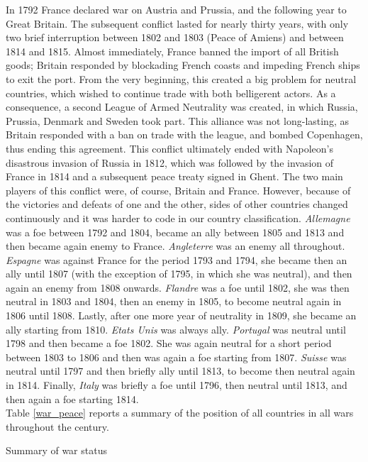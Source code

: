 \documentclass[12pt,a4paper,notitlepage,english]{article}
\begin{document}
In 1792 France declared war on Austria and Prussia, and the following year to Great Britain.
The subsequent conflict lasted for nearly thirty years, with only two brief interruption between 1802 and 1803 (Peace of Amiens) and between 1814 and 1815.
Almost immediately, France banned the import of all British goods; Britain responded by blockading French coasts and impeding French ships to exit the port.
From the very beginning, this created a big problem for neutral countries, which wished to continue trade with both belligerent actors.
As a consequence, a second League of Armed Neutrality was created, in which Russia, Prussia, Denmark and Sweden took part.
This alliance was not long-lasting, as Britain responded with a ban on trade with the league, and bombed Copenhagen, thus ending this agreement.
This conflict ultimately ended with Napoleon's disastrous invasion of Russia in 1812, which was followed by the invasion of France in 1814 and a subsequent peace treaty signed in Ghent.
The two main players of this conflict were, of course, Britain and France.
However, because of the victories and defeats of one and the other, sides of other countries changed continuously and it was harder to code in our country classification.
\textit{Allemagne} was a foe between 1792 and 1804, became an ally between 1805 and 1813 and then became again enemy to France.
\textit{Angleterre} was an enemy all throughout.
\textit{Espagne} was against France for the period 1793 and 1794, she became then an ally until 1807 (with the exception of 1795, in which she was neutral), and then again an enemy from 1808 onwards.
\textit{Flandre} was a foe until 1802, she was then neutral in 1803 and 1804, then an enemy in 1805, to become neutral again in 1806 until 1808.
Lastly, after one more year of neutrality in 1809, she became an ally starting from 1810.
\textit{Etats Unis} was always ally.
\textit{Portugal} was neutral until 1798 and then became a foe 1802.
She was again neutral for a short period between 1803 to 1806 and then was again a foe starting from 1807.
\textit{Suisse} was neutral until 1797 and then briefly ally until 1813, to become then neutral again in 1814.
Finally, \textit{Italy} was briefly a foe until 1796, then neutral until 1813, and then again a foe starting 1814.\\
Table \ref{war_peace} reports a summary of the position of all countries in all wars throughout the century.

\begin{table}
\centering
\caption{Summary of war status}\label{war_peace}

\end{table} 
\end{document}

